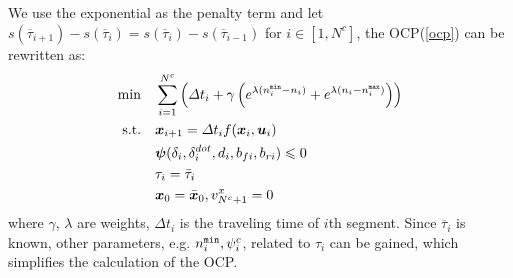 \documentclass[conference, onecolumn]{IEEEtran}
\begin{document}
We use the exponential as the penalty term and let $s(\overline{\tau}_{i+1})-s(\overline{\tau}_{i})=s(\overline{\tau}_{i})-s(\overline{\tau}_{i-1})$ for $i \in [1,N^c]$, the OCP(\ref{ocp}) can be rewritten as:
\begin{subequations}
	\begin{align}
		\min \quad & \sum_{i = 1}^{N^{c}}\left(\varDelta t_i + \gamma\left(e^{\lambda(n^{\tt min}_i-n_i) }+e^{\lambda(n_i-n^{\tt max}_i) }\right)\right)\\
		\textrm{s.t.} \quad & \boldsymbol{x}_{i+1}=\varDelta t_i f(\boldsymbol{x}_i,\boldsymbol{u}_i)\\
		\quad &  \boldsymbol{\psi}(\delta_i,\delta^{dot}_i,d_i,b_{fi},b_{ri})\leqslant 0 \\
		\quad & \tau_i=\bar{\tau}_i \\
		\quad & \boldsymbol{x}_0=\bar{\boldsymbol{x}}_0,v^x_{N^c+1}=0
		\label{ocp_refine}
	\end{align}
\end{subequations}
where $\gamma$, $\lambda$ are weights, $\varDelta t_i$ is the traveling time of $i$th segment. Since $\overline{\tau}_{i}$ is known, other parameters, e.g. $n^{\tt min}_i,\psi^c_i$, related to $\tau_{i}$ can be gained, which simplifies the calculation of the OCP. 
\end{document}
